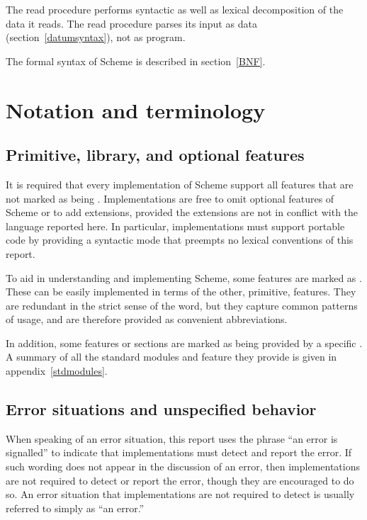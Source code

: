 The {\cf read} procedure performs syntactic as well as lexical decomposition of
the data it reads.  The {\cf read} procedure parses its input as data
(section~\ref{datumsyntax}), not as program.

The formal syntax of Scheme is described in section~\ref{BNF}.


\section{Notation and terminology}


\subsection{Primitive, library, and optional features}
\label{qualifiers}

It is required that every implementation of Scheme support all
features that are not marked as being .  Implementations are
free to omit optional features of Scheme or to add extensions,
provided the extensions are not in conflict with the language reported
here.  In particular, implementations must support portable code by
providing a syntactic mode that preempts no lexical conventions of this
report.

To aid in understanding and implementing Scheme, some features are marked
as . These can be easily implemented in terms of the other,
primitive, features.  They are redundant in the strict sense of
the word, but they capture common patterns of usage, and are therefore
provided as convenient abbreviations.

In addition, some features or sections are marked as being provided by
a specific .  A summary of all the standard modules
and feature they provide is given in appendix~\ref{stdmodules}.

\subsection{Error situations and unspecified behavior}

When speaking of an error situation, this report uses the phrase ``an
error is signalled'' to indicate that implementations must detect and
report the error.  If such wording does not appear in the discussion of
an error, then implementations are not required to detect or report the
error, though they are encouraged to do so.  An error situation that
implementations are not required to detect is usually referred to simply
as ``an error.''

